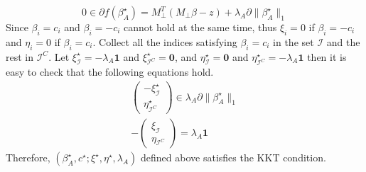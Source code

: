\documentclass{article}
\begin{document}
\begin{equation}
    0\in\partial f(\beta^\star_A) = M_{\perp}^T(M_{\perp}\beta-z) + \lambda_A \partial \|\beta_A^\star\|_1
\end{equation}
Since $\beta_i=c_i$ and $\beta_i=-c_i$ cannot hold at the same time, thus $\xi_i=0$ if $\beta_i=-c_i$ and $\eta_i=0$ if $\beta_i=c_i$. Collect all the indices satisfying $\beta_i=c_i$ in the set $\mathcal{I}$ and the rest in $\mathcal{I}^C$. Let $\xi^\star_{\mathcal{I}}=-\lambda_A\boldsymbol{1}$ and $\xi^\star_{\mathcal{I}^C}=\boldsymbol{0}$, and $\eta^\star_{\mathcal{I}}=\boldsymbol{0}$ and $\eta^\star_{\mathcal{I}^C}=-\lambda_A\boldsymbol{1}$ then it is easy to check that the following equations hold.
\begin{equation}
    \begin{aligned}
        \begin{pmatrix}
        -\xi^\star_\mathcal{I}\\
        \eta^\star_{\mathcal{I}^C}
        \end{pmatrix}\in \lambda_A\partial\|\beta^\star_A\|_1\\
        -\begin{pmatrix}
            \xi_{\mathcal{I}}\\
            \eta_{\mathcal{I}^C}
        \end{pmatrix} = \lambda_A\boldsymbol{1}
    \end{aligned}
\end{equation}
Therefore, $(\beta_A^\star, c^\star; \xi^\star, \eta^\star,\lambda_A)$ defined above satisfies the KKT condition.
\end{document}
